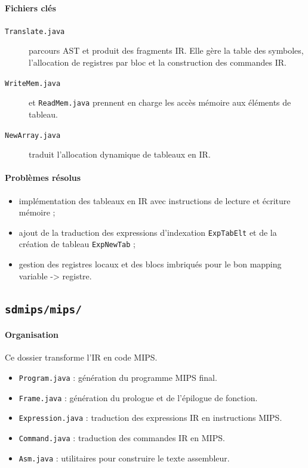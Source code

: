 \documentclass[a4paper,11pt]{article}
\begin{document}
\paragraph{Fichiers clés}
\begin{description}
  \item[\texttt{Translate.java}] parcours AST et produit des fragments IR. Elle gère la table des symboles, l'allocation de registres par bloc et la construction des commandes IR.
  \item[\texttt{WriteMem.java}] et \texttt{ReadMem.java} prennent en charge les accès mémoire aux éléments de tableau.
  \item[\texttt{NewArray.java}] traduit l'allocation dynamique de tableaux en IR.
\end{description}

\paragraph{Problèmes résolus}
\begin{itemize}
  \item implémentation des tableaux en IR avec instructions de lecture et écriture mémoire ;
  \item ajout de la traduction des expressions d'indexation \texttt{ExpTabElt} et de la création de tableau \texttt{ExpNewTab} ;
  \item gestion des registres locaux et des blocs imbriqués pour le bon mapping variable -> registre.
\end{itemize}

\subsection{\texttt{sdmips/mips/}}
\paragraph{Organisation}
Ce dossier transforme l'IR en code MIPS.
\begin{itemize}
  \item \texttt{Program.java} : génération du programme MIPS final.
  \item \texttt{Frame.java} : génération du prologue et de l'épilogue de fonction.
  \item \texttt{Expression.java} : traduction des expressions IR en instructions MIPS.
  \item \texttt{Command.java} : traduction des commandes IR en MIPS.
  \item \texttt{Asm.java} : utilitaires pour construire le texte assembleur.
\end{itemize}
\end{document}
